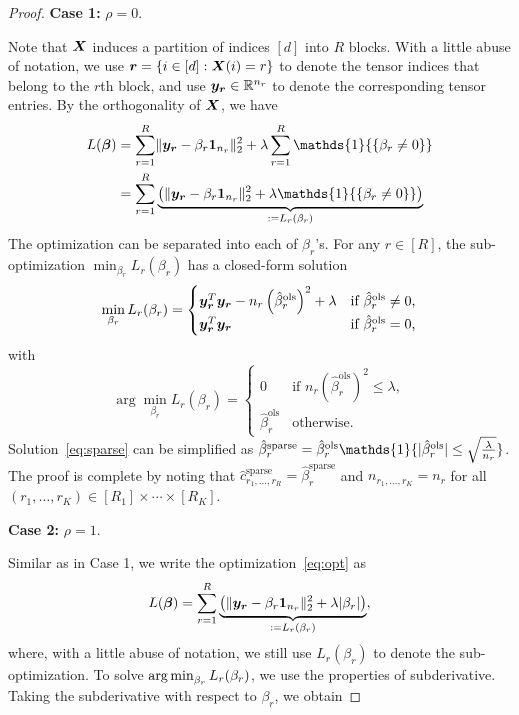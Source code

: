 \documentclass{article}
\newcommand*{\KeepStyleUnderBrace}[1]{%
  \mathop{%
    \mathchoice
    {\underbrace{\displaystyle#1}}%
    {\underbrace{\textstyle#1}}%
    {\underbrace{\scriptstyle#1}}%
    {\underbrace{\scriptscriptstyle#1}}%
  }\limits
}
\begin{document}
\begin{appendices}
\begin{proof}
{\bf Case 1: } $\rho=0$.\par
Note that $\bm X$ induces a partition of indices $[d]$ into $R$ blocks. With a little abuse of notation, we use ${\bm{r}}=\{i\in[d]:\bm X(i)=r\}$ to denote the tensor indices that belong to the $r$th block, and use $\bm{y}_{\bm{r}}\in\mathbb{R}^{n_r}$ to denote the corresponding tensor entries. By the orthogonality of $\bm X$, we have
\begin{align}
L(\boldsymbol{\beta})&=\sum_{r=1}^R \vnormSize{}{\my_{\mr}-\beta_r\mathbf{1}_{n_r}}^2+\lambda \sum_{r=1}^R \mathds{1}{\{ \beta_r\neq 0\}}\\
&=\sum_{r=1}^R\KeepStyleUnderBrace{\left( \vnormSize{}{\my_{\mr}-\beta_r\mathbf{1}_{n_r}}^2+\lambda \mathds{1}{\{ \beta_r\neq 0\}}\right)}_{:=L_r(\beta_r)}
\end{align}
The optimization can be separated into each of $\beta_r$'s. For any $r\in[R]$, the sub-optimization $\min_{\beta_r}L_r(\beta_r)$ has a closed-form solution
\[
\min_{\beta_r} L_r(\beta_r)
=\begin{cases}
\bm{y}^T_{\bm{r}}\bm{y}_{\bm{r}}-n_r\left(\hat \beta_r^{\text{ols}}\right)^2+\lambda& \text{if $\hat \beta^{\text{ols}}_r\neq 0$,}\\
\bm{y}^T_{\bm{r}}\bm{y}_{\bm{r}}&\text{if $\hat \beta^{\text{ols}}_r=0$,}
\end{cases}
\]
with
\begin{equation}\label{eq:sparse}
\arg\min_{\beta_r} L_r(\beta_r)=
\begin{cases}
0\quad& \text{if $n_r\left(\hat \beta_r^{\text{ols}}\right)^2 \leq \lambda$},\\
\hat \beta_r^{\text{ols}} &\text{otherwise}.
\end{cases}
\end{equation}
Solution~\eqref{eq:sparse} can be simplified as $\hat \beta^{\text{sparse}}_r=\hat \beta^{\text{ols}}_r\mathds{1}\{|\hat \beta^{\text{ols}}_r| \leq \sqrt{\lambda \over n_r}\}$. The proof is complete by noting that $\hat c^{\text{sparse}}_{r_1,\ldots,r_R}=\hat \beta^{\text{sparse}}_r$ and $n_{r_1,\ldots,r_K}=n_r$ for all $(r_1,\ldots,r_K)\in[R_1]\times \cdots \times [R_K]$.



{\bf Case 2: } $\rho=1$.\par

Similar as in Case 1, we write the optimization~\eqref{eq:opt} as
\[
L({\bm \beta})=\sum_{r=1}^R\KeepStyleUnderBrace{\left(\vnormSize{}{\my_{\mr}-\beta_r\mathbf{1}_{n_r}}^2+\lambda |\beta_{r}|\right)}_{:=L_r(\beta_r)},
\]
where, with a little abuse of notation, we still use $L_r(\beta_r)$ to denote the sub-optimization. To solve $\operatorname*{arg\,min}_{\beta_r}L_r(\beta_r)$, we use the properties of subderivative. Taking the subderivative with respect to $\beta_r$, we obtain
	

\end{proof}
\end{appendices}
\end{document}
